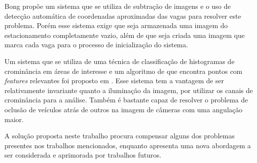 Bong \cite{bong2008integrated} propõe um sistema que se utiliza de subtração de imagens e o uso de detecção automática de coordenadas aproximadas das vagas para resolver este problema. Porém esse sistema exige que seja armazenada uma imagem do estacionamento completamente vazio, além de que seja criada uma imagem que marca cada vaga para o processo de inicialização do sistema.

Um sistema que se utiliza de uma técnica de classificação de histogramas de crominância em áreas de interesse e um algoritmo de que encontra pontos com \textit{features} relevantes foi proposto em \cite{true2007vacant}. Esse sistema tem a vantagem de ser relativamente invariante quanto a iluminação da imagem, por utilizar os canais de crominância para a análise. Também é bastante capaz de resolver o problema de oclusão de veículos atrás de outros na imagem de câmeras com uma angulação maior.

A solução proposta neste trabalho procura compensar alguns dos problemas presentes nos trabalhos mencionados, enquanto apresenta uma nova abordagem a ser considerada e aprimorada por trabalhos futuros.








